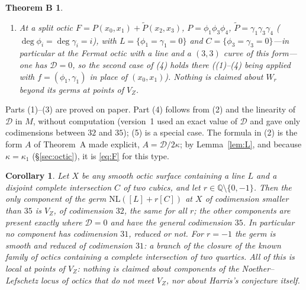 \documentclass[11pt]{article}
\numberwithin{equation}{section}
\newtheorem*{thmB}{Theorem B}
\newtheorem*{cor*}{Corollary}
\theoremstyle{remark}
\newcommand{\QQ}{\mathbb{Q}}
\newcommand{\NL}{\mathrm{NL}}
\newcommand{\VZ}{V_Z}
\newcommand{\cD}{\mathcal{D}}
\newcommand{\cM}{\mathcal{M}}
\begin{document}
\begin{thmB}
\begin{enumerate}[label=\textup{(\arabic*)}]
codimension $36$, and each $\theta_Q$, $Q\in K\setminus\{0\}$, has zero $2$-jet and nonzero $3$-jet
$dy^2\cdot du'_Q$ on $\cM_r$. Hence $\VZ$ is the only component of $\NL(r)$ through $X$ of codimension smaller
than $35$, and it is the same for all $r$; in particular no component has codimension $31$. For $r\neq r'$ the
sets $W_r\setminus\VZ$ and $W_{r'}\setminus\VZ$ are disjoint.
\item At a split octic $F=P(x_0,x_1)+\tilde P(x_2,x_3)$, $P=\phi_1\phi_3\phi_4$,
$\tilde P=\gamma_1\gamma_3\gamma_4$ \textup{(}$\deg\phi_i=\deg\gamma_i=i$\textup{)}, with
$L=\{\phi_1=\gamma_1=0\}$ and $C=\{\phi_3=\gamma_3=0\}$---in particular at the Fermat octic with a line and a $(3,3)$ curve of this form---one has $\cD=0$, so the second case of \textup{(4)} holds there
\textup{(}\textup{(1)--(4)} being applied with $f=(\phi_1,\gamma_1)$ in place of $(x_0,x_1)$\textup{)}. Nothing
is claimed about $W_r$ beyond its germs at points of $\VZ$.
\end{enumerate}
\end{thmB}

Parts (1)--(3) are proved on paper. Part (4) follows from (2) and the linearity of $\cD$ in $M$, without computation (version~1 used an exact
value of $\cD$ and gave only codimensions between $32$ and $35$); (5) is a special case. The formula in (2) is the form $A$ of Theorem~A made explicit, $A=\cD/2\kappa$; by
Lemma~\ref{lem:L}, and because $\kappa=\kappa_1$ (\S\ref{sec:octic}), it is \eqref{eq:F} for this type.

\begin{cor*}
Let $X$ be any smooth octic surface containing a line $L$ and a disjoint complete intersection $C$ of two
cubics, and let $r\in\QQ\setminus\{0,-1\}$. Then the only component of the germ $\NL([L]+r[C])$ at $X$ of
codimension smaller than $35$ is $\VZ$, of codimension $32$, the same for all $r$; the other components are present exactly where $\cD=0$ and have the general codimension $35$.
In particular no component has codimension $31$, reduced or not. For $r=-1$ the germ is smooth and reduced of
codimension $31$: a branch of the closure of the known family of octics containing a complete intersection of
two quartics. All of this is local at points of $\VZ$: nothing is claimed about components of the
Noether--Lefschetz locus of octics that do not meet $\VZ$, nor about Harris's conjecture itself.
\end{cor*}
\end{document}
